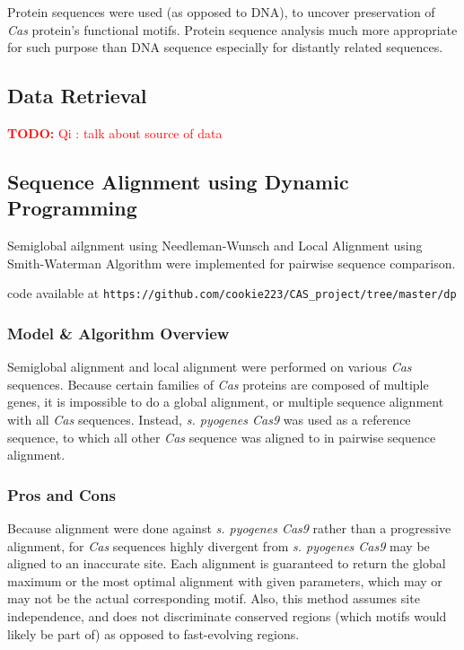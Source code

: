 \documentclass[11pt, oneside]{article}
\newcommand{\TODO}[1]{\textcolor{red}{\textbf{TODO: } #1}}
\begin{document}
Protein sequences were used (as opposed to DNA), to uncover preservation of \textit{Cas} protein's functional motifs. Protein sequence analysis much more appropriate for such purpose than DNA sequence especially for distantly related sequences. 

\subsection{Data Retrieval}

\TODO{Qi : talk about source of data}

\subsection{Sequence Alignment using Dynamic Programming} \label{dpProtocol}

Semiglobal ailgnment using Needleman-Wunsch\cite{needlemanwunsch} and Local Alignment using Smith-Waterman Algorithm\cite{smithwaterman} were implemented for pairwise sequence comparison.

code available at \texttt{https://github.com/cookie223/CAS\_project/tree/master/dp}

\medskip
\subsubsection{Model \& Algorithm Overview}

Semiglobal alignment and local alignment were performed on various \textit{Cas} sequences. Because certain families of \textit{Cas} proteins are composed of multiple genes, it is impossible to do a global alignment, or multiple sequence alignment with all \textit{Cas} sequences. Instead, \textit{s. pyogenes Cas9} was used as a reference sequence, to which all other \textit{Cas} sequence was aligned to in pairwise sequence alignment. 

\medskip
\subsubsection{Pros and Cons}

Because alignment were done against \textit{s. pyogenes Cas9} rather than a progressive alignment, for \textit{Cas} sequences highly divergent from \textit{s. pyogenes Cas9} may be aligned to an inaccurate site. Each alignment is guaranteed to return the global maximum or the most optimal alignment with given parameters, which may or may not be the actual corresponding motif. Also, this method assumes site independence, and does not discriminate conserved regions (which motifs would likely be part of) as opposed to fast-evolving regions.
\end{document}
